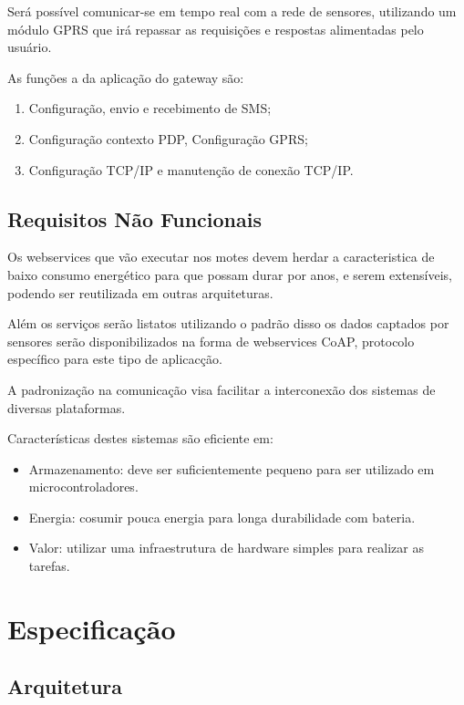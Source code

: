 Ser\'a poss\'ivel comunicar-se em tempo real com a rede de sensores, utilizando um m\'odulo GPRS que ir\'a repassar as requisi\c{c}\~oes e respostas alimentadas pelo usu\'ario.

As fun\c{c}\~oes a da aplica\c{c}\~ao do gateway s\~ao:
\begin{enumerate}
    \item Configura\c{c}\~ao, envio e recebimento de SMS;
    \item Configura\c{c}\~ao contexto PDP, Configura\c{c}\~ao GPRS;
    \item Configura\c{c}\~ao TCP/IP e manuten\c{c}\~ao de conex\~ao TCP/IP.
\end{enumerate}

\subsection{Requisitos N\~ao Funcionais}

Os webservices que v\~ao executar nos motes devem herdar a caracteristica de baixo consumo energ\'etico para que possam durar por anos, e serem extens\'iveis, podendo ser reutilizada em outras arquiteturas.

Al\'em os servi\c{c}os ser\~ao listatos utilizando o padr\~ao \cite{rfc6690} disso os dados captados por sensores ser\~ao disponibilizados na forma de webservices CoAP, protocolo espec\'ifico para este tipo de aplicac\c{c}\~ao.

A padroniza\c{c}\~ao na comunica\c{c}\~ao visa facilitar a interconex\~ao dos sistemas de diversas plataformas.

Caracter\'isticas destes sistemas s\~ao eficiente em:
    \begin{itemize}
        \item Armazenamento: deve ser suficientemente pequeno para ser utilizado em microcontroladores.
        \item Energia: cosumir pouca energia para longa durabilidade com bateria.
        \item Valor: utilizar uma infraestrutura de hardware simples para realizar as tarefas.
    \end{itemize}


\section{Especifica\c{c}\~ao}
\subsection{Arquitetura}

